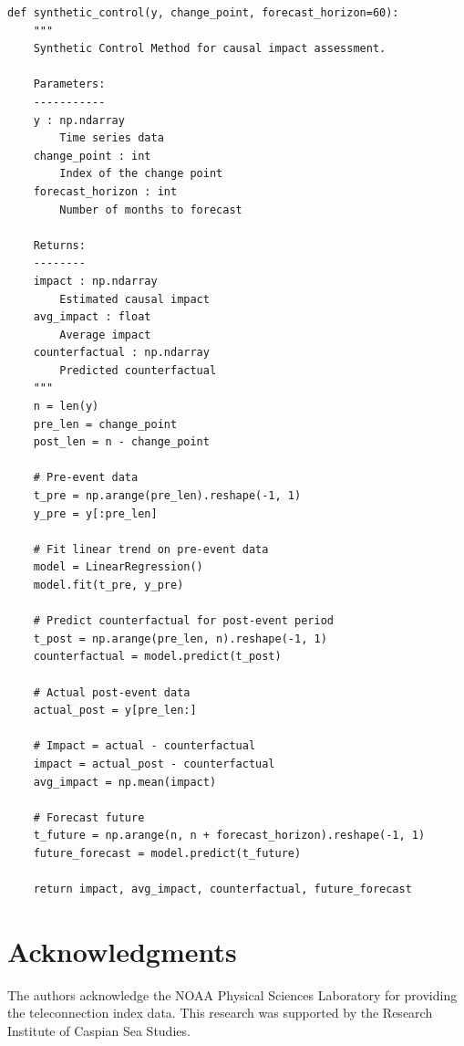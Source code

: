 \documentclass[12pt,a4paper,twocolumn]{article}
\begin{document}
\begin{lstlisting}[caption={Synthetic Control Method}, label=lst:scm]
def synthetic_control(y, change_point, forecast_horizon=60):
    """
    Synthetic Control Method for causal impact assessment.
    
    Parameters:
    -----------
    y : np.ndarray
        Time series data
    change_point : int
        Index of the change point
    forecast_horizon : int
        Number of months to forecast
    
    Returns:
    --------
    impact : np.ndarray
        Estimated causal impact
    avg_impact : float
        Average impact
    counterfactual : np.ndarray
        Predicted counterfactual
    """
    n = len(y)
    pre_len = change_point
    post_len = n - change_point
    
    # Pre-event data
    t_pre = np.arange(pre_len).reshape(-1, 1)
    y_pre = y[:pre_len]
    
    # Fit linear trend on pre-event data
    model = LinearRegression()
    model.fit(t_pre, y_pre)
    
    # Predict counterfactual for post-event period
    t_post = np.arange(pre_len, n).reshape(-1, 1)
    counterfactual = model.predict(t_post)
    
    # Actual post-event data
    actual_post = y[pre_len:]
    
    # Impact = actual - counterfactual
    impact = actual_post - counterfactual
    avg_impact = np.mean(impact)
    
    # Forecast future
    t_future = np.arange(n, n + forecast_horizon).reshape(-1, 1)
    future_forecast = model.predict(t_future)
    
    return impact, avg_impact, counterfactual, future_forecast
\end{lstlisting}

\section*{Acknowledgments}
The authors acknowledge the NOAA Physical Sciences Laboratory for providing the teleconnection index data. This research was supported by the Research Institute of Caspian Sea Studies.
\end{document}
